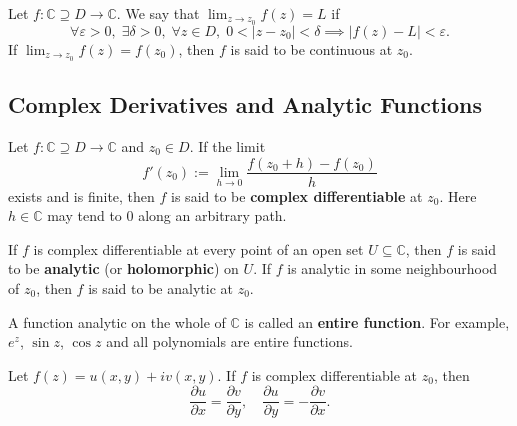 \begin{definition}\label{def:complex_limit}
Let $f: \mathbb{C} \supseteq D \to \mathbb{C}$. We say that $\lim_{z\to z_0} f(z) = L$ if
\[
\forall \varepsilon > 0,\; \exists \delta > 0,\; \forall z \in D,\; 0 < |z - z_0| < \delta \implies |f(z) - L| < \varepsilon.
\]
If $\lim_{z\to z_0} f(z) = f(z_0)$, then $f$ is said to be continuous at $z_0$.
\end{definition}

\subsection{Complex Derivatives and Analytic Functions}\label{sec:analytic_functions}

\begin{definition}\label{def:complex_derivative}
Let $f: \mathbb{C} \supseteq D \to \mathbb{C}$ and $z_0 \in D$. If the limit
\[
f'(z_0) := \lim_{h \to 0} \frac{f(z_0 + h) - f(z_0)}{h}
\]
exists and is finite, then $f$ is said to be \textbf{complex differentiable} at $z_0$. Here $h \in \mathbb{C}$ may tend to $0$ along an arbitrary path.
\end{definition}

\begin{definition}\label{def:analytic_function}
If $f$ is complex differentiable at every point of an open set $U \subseteq \mathbb{C}$, then $f$ is said to be \textbf{analytic} (or \textbf{holomorphic}) on $U$. If $f$ is analytic in some neighbourhood of $z_0$, then $f$ is said to be analytic at $z_0$.
\end{definition}

\begin{definition}\label{def:entire_function}
A function analytic on the whole of $\mathbb{C}$ is called an \textbf{entire function}. For example, $e^z$, $\sin z$, $\cos z$ and all polynomials are entire functions.
\end{definition}

\begin{theorem}\label{thm:cauchy_riemann}
Let $f(z) = u(x,y) + i v(x,y)$. If $f$ is complex differentiable at $z_0$, then
\[
\frac{\partial u}{\partial x} = \frac{\partial v}{\partial y}, \quad \frac{\partial u}{\partial y} = -\frac{\partial v}{\partial x}.
\]
\end{theorem}

